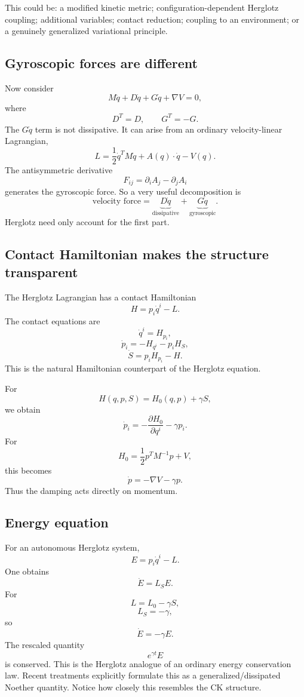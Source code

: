 This could be:
a modified kinetic metric;
configuration-dependent Herglotz coupling;
additional variables;
contact reduction;
coupling to an environment;
or a genuinely generalized variational principle.

\subsection{Gyroscopic forces are different}

Now consider $$ M\ddot q+ D\dot q+ G\dot q+ \nabla V=0, $$
where $$ D^T=D, \qquad G^T=-G. $$
The \(G\dot q\) term is not dissipative.
It can arise from an ordinary velocity-linear Lagrangian,
$$ L= \frac12\dot q^TM\dot q +A(q)\cdot\dot q -V(q). $$
The antisymmetric derivative
$$ F_{ij} = \partial_iA_j-\partial_jA_i $$
generates the gyroscopic force.
So a very useful decomposition is
$$ \boxed{ \text{velocity force} = \underbrace{D\dot q}_{\text{dissipative}} + \underbrace{G\dot q}_{\text{gyroscopic}}. } $$
Herglotz need only account for the first part.

\subsection{Contact Hamiltonian makes the structure transparent}

The Herglotz Lagrangian has a contact Hamiltonian
$$ H=p_i\dot q^i-L. $$
The contact equations are
$$ \dot q^i=H_{p_i}, $$ $$ \dot p_i=-H_{q^i}-p_iH_S, $$ $$ \dot S=p_iH_{p_i}-H. $$
This is the natural Hamiltonian counterpart of the Herglotz equation.

For $$ \boxed{ H(q,p,S) = H_0(q,p)+\gamma S, } $$
we obtain $$ \dot p_i = -\frac{\partial H_0}{\partial q^i} -\gamma p_i. $$
For $$ H_0=\frac12p^TM^{-1}p+V, $$
this becomes $$ \boxed{ \dot p=-\nabla V-\gamma p. } $$
Thus the damping acts directly on momentum.

\subsection{Energy equation}

For an autonomous Herglotz system, $$ E=p_i\dot q^i-L. $$
One obtains 
\begin{equation}
\boxed{ \dot E=L_S E. } \tag{17} 
\end{equation}
For $$ L=L_0-\gamma S, $$ $$ L_S=-\gamma, $$
so $$ \boxed{ \dot E=-\gamma E. } $$
The rescaled quantity
$$ \boxed{ e^{\gamma t}E } $$
is conserved.
This is the Herglotz analogue of an ordinary energy conservation law. Recent treatments explicitly formulate this as a generalized/dissipated Noether quantity.
Notice how closely this resembles the CK structure.

